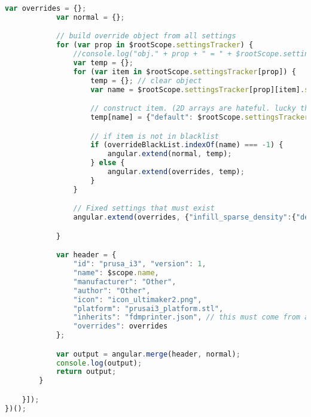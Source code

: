 \begin{lstlisting}[language=JavaScript, label={lst:settingsController}, caption=This code is the main controller which brings in the static settings files and converts them into settings items.]
            var overrides = {};
            var normal = {};

            // build override object from all settings
            for (var prop in $rootScope.settingsTracker) {
                //console.log("obj." + prop + " = " + $rootScope.settingsTracker[prop]);
                var temp = {};
                for (var item in $rootScope.settingsTracker[prop]) {
                    temp = {}; // clear object
                    var name = $rootScope.settingsTracker[prop][item].setting;

                    // construct item. (2D arrays are hateful. lucky this one is small)
                    temp[name] = {"default": $rootScope.settingsTracker[prop][item].default};

                    // if item is not in blacklist
                    if (overrideBlackList.indexOf(name) === -1) {
                        angular.extend(normal, temp);
                    } else {
                        angular.extend(overrides, temp);
                    }
                }

                // Fixed settings that must exist
                angular.extend(overrides, {"infill_sparse_density":{"default":100.0}});

            }

            var header = {
                "id": "prusa_i3", "version": 1,
                "name": $scope.name,
                "manufacturer": "Other",
                "author": "Other",
                "icon": "icon_ultimaker2.png",
                "platform": "prusai3_platform.stl",
                "inherits": "fdmprinter.json", // this must come from a symbolic link in the directory.
                "overrides": overrides
            };

            var output = angular.merge(header, normal);
            console.log(output);
            return output;
        }

    }]);
})();
\end{lstlisting}

